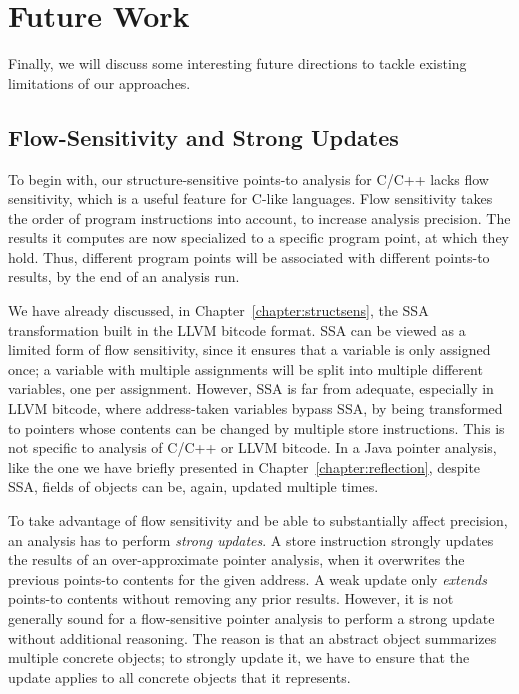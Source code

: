 

\section{Future Work}

Finally, we will discuss some interesting future directions to tackle
existing limitations of our approaches.

\subsection{Flow-Sensitivity and Strong Updates}

To begin with, our structure-sensitive points-to analysis for C/C++
lacks flow sensitivity, which is a useful feature for C-like
languages. Flow sensitivity takes the order of program instructions
into account, to increase analysis precision. The results it computes
are now specialized to a specific program point, at which they
hold. Thus, different program points will be associated with different
points-to results, by the end of an analysis run.

We have already discussed, in Chapter~\ref{chapter:structsens}, the
SSA transformation built in the LLVM bitcode format. SSA can be viewed
as a limited form of flow sensitivity, since it ensures that a
variable is only assigned once; a variable with multiple assignments
will be split into multiple different variables, one per assignment.
However, SSA is far from adequate, especially in LLVM bitcode, where
address-taken variables bypass SSA, by being transformed to pointers
whose contents can be changed by multiple store instructions. This is
not specific to analysis of C/C++ or LLVM bitcode. In a Java pointer
analysis, like the one we have briefly presented in
Chapter~\ref{chapter:reflection}, despite SSA, fields of objects can
be, again, updated multiple times.

To take advantage of flow sensitivity and be able to substantially
affect precision, an analysis has to perform \emph{strong updates}. A
store instruction strongly updates the results of an over-approximate
pointer analysis, when it overwrites the previous points-to contents
for the given address. A weak update only \emph{extends} points-to
contents without removing any prior results. However, it is not
generally sound for a flow-sensitive pointer analysis to perform a
strong update without additional reasoning. The reason is that an
abstract object summarizes multiple concrete objects; to strongly
update it, we have to ensure that the update applies to all concrete
objects that it represents.

